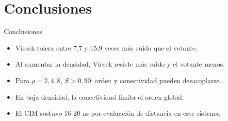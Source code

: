 \documentclass[aspectratio=169,11pt]{beamer}
\begin{document}
\section{Conclusiones}
\begin{frame}
  \sectionpage
\end{frame}

\begin{frame}{Conclusiones}
  \begin{itemize}
    \item Vicsek tolera entre 7,7 y 15,9 veces más ruido que el votante.
    \item Al aumentar la densidad, Vicsek resiste más ruido y el votante menos.
    \item Para $\rho=2,4,8$, $S>0{,}90$: orden y conectividad pueden desacoplarse.
    \item En baja densidad, la conectividad limita el orden global.
    \item El CIM sostuvo 16-20 ns por evaluación de distancia en este sistema.
  \end{itemize}
\end{frame}
\end{document}
